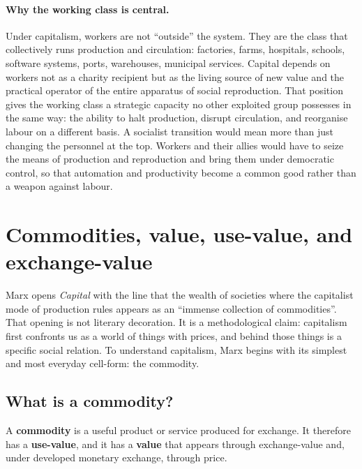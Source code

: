 \paragraph{Why the working class is central.}
Under capitalism, workers are not ``outside'' the system. They are the class that collectively runs production and circulation: factories, farms, hospitals,
schools, software systems, ports, warehouses, municipal services. Capital depends on workers not as a charity recipient but as the living source of new value
and the practical operator of the entire apparatus of social reproduction.\cite{Marx1867,MarxEngels1848}
That position gives the working class a strategic capacity no other exploited group possesses in the same way: the ability to halt production, disrupt circulation,
and reorganise labour on a different basis. A socialist transition would mean more than just changing the personnel at the top. Workers and their allies would have to seize
the means of production and reproduction and bring them under democratic control, so that automation and productivity become a common good rather than a weapon against labour.

\section{Commodities, value, use-value, and exchange-value}
\label{sec:commodities}

Marx opens \emph{Capital} with the line that the wealth of societies where the capitalist mode of production
rules appears as an ``immense collection of commodities''.\cite{Marx1867} That opening is not literary
decoration. It is a methodological claim: capitalism first confronts us as a world of things with prices,
and behind those things is a specific social relation. To understand capitalism, Marx begins with its
simplest and most everyday cell-form: the commodity.

\subsection{What is a commodity?}
\label{sec:what-is-a-commodity}

A \textbf{commodity} is a useful product or service produced for exchange. It therefore has a \textbf{use-value}, and it has a \textbf{value} that appears through exchange-value and, under developed monetary exchange, through price.

